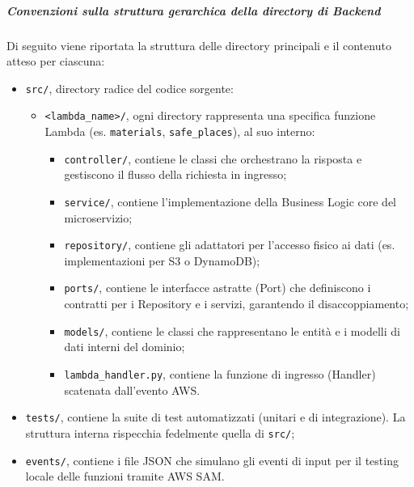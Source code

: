 \documentclass[a4paper,12pt]{article}
\begin{document}
\subparagraph{Convenzioni sulla struttura gerarchica della directory di Backend} \label{subpar:convenzioni-gerarchia-dir-be}
Di seguito viene riportata la struttura delle directory principali e il contenuto atteso per ciascuna:
\begin{itemize}
    \item \texttt{src/}, directory radice del codice sorgente:
    \begin{itemize}
        \item \texttt{<lambda\_name>/}, ogni directory rappresenta una specifica funzione Lambda (es. \texttt{materials}, \texttt{safe\_places}), al suo interno:
        \begin{itemize}
            \item \texttt{controller/}, contiene le classi che orchestrano la risposta e gestiscono il flusso della richiesta in ingresso;
            \item \texttt{service/}, contiene l'implementazione della Business Logic core del microservizio;
            \item \texttt{repository/}, contiene gli adattatori per l'accesso fisico ai dati (es. implementazioni per S3 o DynamoDB);
            \item \texttt{ports/}, contiene le interfacce astratte (Port) che definiscono i contratti per i Repository e i servizi, garantendo il disaccoppiamento;
            \item \texttt{models/}, contiene le classi che rappresentano le entità e i modelli di dati interni del dominio;
            \item \texttt{lambda\_handler.py}, contiene la funzione di ingresso (Handler) scatenata dall'evento AWS.
        \end{itemize}
    \end{itemize}
    \item \texttt{tests/}, contiene la suite di test automatizzati (unitari e di integrazione). La struttura interna rispecchia fedelmente quella di \texttt{src/};
    \item \texttt{events/}, contiene i file JSON che simulano gli eventi di input per il testing locale delle funzioni tramite AWS SAM.
\end{itemize}
\end{document}
